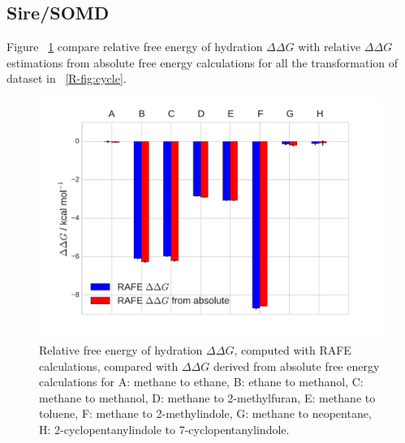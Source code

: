 \documentclass[journal=jctcce,manuscript=suppinfo]{achemso}
\begin{document}
\subsection{Sire/SOMD}
\label{sec:sire-probs}


Figure ~\ref{fig:sire_histogram} compare relative free energy of hydration $\Delta\Delta G$ with relative $\Delta\Delta G$ estimations from absolute free  energy calculations for all the transformation of dataset in ~\ref{R-fig:cycle}.
\begin{figure}[ht]
  \includegraphics[width=\textwidth]{figures/sire_histogram.pdf}
  \caption{Relative free energy of hydration $\Delta\Delta G$, computed with 
  RAFE calculations, compared with $\Delta\Delta G$ derived from absolute free 
  energy calculations for A: methane to ethane, B: ethane to methanol, C: 
  methane to methanol, D: methane to 2-methylfuran, E: methane to toluene,
    F: methane to 2-methylindole, G: methane to neopentane, H: 
    2-cyclopentanylindole to 7-cyclopentanylindole.}
  \label{fig:sire_histogram}
\end{figure}
\end{document}
